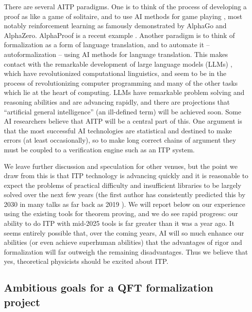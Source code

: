 \documentclass{article}
\newcommand{\1}{\mathbbm{1}}
\theoremstyle{plain}
\theoremstyle{definition}
\numberwithin{equation}{section}
\begin{document}
There are several AITP paradigms.  One is to think of the process of developing a proof as like a game of solitaire, and to use AI methods for game playing \cite{}, most notably reinforcement learning as famously demonstrated by AlphaGo and AlphaZero.  AlphaProof is a recent example \cite{}.
Another paradigm is to think of formalization as a form of language translation, and to automate it -- autoformalization \cite{} -- using AI methods for language translation.  This makes contact with the remarkable development of large language models (LLMs) \cite{}, which have revolutionized computational linguistics, and seem to be in the process of revolutionizing computer programming and many of the other tasks which lie at the heart of computing.  LLMs have remarkable problem solving and reasoning abilities and are advancing rapidly, and there are projections that ``artificial general intelligence'' (an ill-defined term) will be achieved soon.  Some AI researchers believe that AITP will be a central part of this.  One argument is that the most successful AI technologies are statistical and destined to make errors (at least occasionally), so to make long correct chains of argument they must be coupled to a verification engine such as an ITP system.

We leave further discussion and speculation for other venues, but the point we draw from this is that ITP technology is advancing quickly and it is reasonable to expect the problems of practical difficulty and insufficient libraries to be largely solved over the next few years (the first author has consistently predicted this by 2030 in many talks as far back as 2019 \cite{}).  We will report below on our experience using the existing tools for theorem proving, and we do see rapid progress: our ability to do ITP with mid-2025 tools is far greater than it was a year ago.
It seems entirely possible that, over the coming years, AI will so much enhance our abilities (or even achieve superhuman abilities) that the advantages of rigor and formalization will far outweigh the remaining disadvantages.  Thus we believe that yes, theoretical physicists should be excited about ITP.

\subsection{Ambitious goals for a QFT formalization project}
\end{document}
